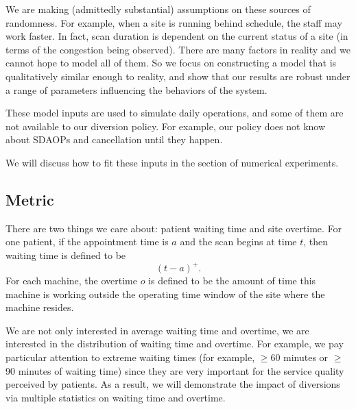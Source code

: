 We are making (admittedly substantial) assumptions on these sources of randomness.
For example, when a site is running behind schedule, the staff
may work faster. In fact, scan duration is dependent on the current status
of a site (in terms of the congestion being observed).
There are many factors in reality and we cannot
hope to model all of them. So we focus on constructing a model
that is qualitatively similar enough to reality, and show that our
results are robust under a range of parameters influencing the
behaviors of the system.

These model inputs are used to simulate daily operations, and
some of them are not available to our diversion policy.
For example, our policy does not know about SDAOPs and cancellation
until they happen.

We will discuss how to fit these inputs in the section of
numerical experiments.

\subsection{Metric}

There are two things we care about: patient waiting time and
site overtime. For one patient, if the appointment time is $a$
and the scan begins at time $t$, then waiting time is defined
to be
\[  (t - a)^+. \]
For each machine, the overtime $o$ is defined to be the amount of
time this machine is working outside the operating time window
of the site where the machine resides.

We are not only interested in average waiting time and
overtime, we are interested in the distribution of waiting time
and overtime. For example, we pay particular attention to extreme
waiting times (for example, $\ge$60 minutes or $\ge$90 minutes of waiting time)
since they are very important for the service quality perceived by patients.
As a result, we will demonstrate the impact of diversions via
multiple statistics on waiting time and overtime.
